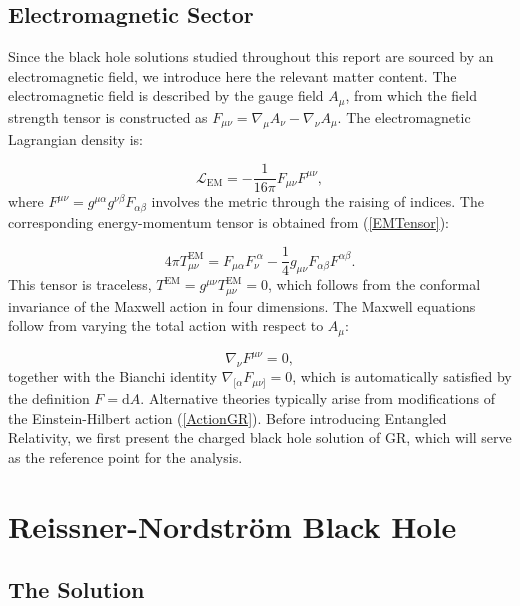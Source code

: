\documentclass[floats,floatfix,aps, preprintnumbers,nofootinbib]{revtex4-2}
\newcommand{\mrm}{\mathrm}
\newcommand{\mcal}{\mathcal}
\begin{document}
\subsection{Electromagnetic Sector}

Since the black hole solutions studied throughout this report are sourced by an electromagnetic field, we introduce here the relevant matter content. The electromagnetic field is described by the gauge field $A_\mu$, from which the field strength tensor is constructed as $F_{\mu\nu} = \nabla_\mu A_\nu - \nabla_\nu A_\mu$. The electromagnetic Lagrangian density is:

\begin{equation}\label{LagEM}
    \mcal L_{\mrm{EM}} = -\frac{1}{16\pi}F_{\mu\nu}F^{\mu\nu},
\end{equation}
where $F^{\mu\nu} = g^{\mu\alpha}g^{\nu\beta}F_{\alpha\beta}$ involves the metric through the raising of indices. The corresponding energy-momentum tensor is obtained from (\ref{EMTensor}):

\begin{equation}\label{EMTEM}
    4\pi T^{\mrm{EM}}_{\mu\nu} = F_{\mu\alpha}F_\nu^{\;\alpha} - \frac{1}{4}g_{\mu\nu}F_{\alpha\beta}F^{\alpha\beta}.
\end{equation}
This tensor is traceless, $T^{\mrm{EM}} = g^{\mu\nu}T^{\mrm{EM}}_{\mu\nu} = 0$, which follows from the conformal invariance of the Maxwell action in four dimensions. The Maxwell equations follow from varying the total action with respect to $A_\mu$:

\begin{equation}
    \nabla_\nu F^{\mu\nu} = 0,
\end{equation}
together with the Bianchi identity $\nabla_{[\alpha}F_{\mu\nu]} = 0$, which is automatically satisfied by the definition $F = \mrm dA$. Alternative theories typically arise from modifications of the Einstein-Hilbert action (\ref{ActionGR}). Before introducing Entangled Relativity, we first present the charged black hole solution of GR, which will serve as the reference point for the analysis.





\section{Reissner-Nordström Black Hole}
\label{sec:RN}

\subsection{The Solution}
\end{document}
